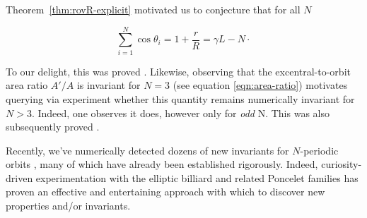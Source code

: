Theorem~\ref{thm:rovR-explicit} motivated us to conjecture that for all $N$

\begin{equation*}
\sum_{i=1}^{N}{\cos\theta_i}=1+\frac{r}{R}=\gamma L - N\cdot
\end{equation*}

\noindent To our delight, this was proved \cite{akopyan2020-invariants,bialy2020-invariants}. Likewise, observing that the excentral-to-orbit area ratio $A'/A$ is invariant for $N=3$ (see equation \eqref{eqn:area-ratio}) motivates querying via experiment whether this quantity remains numerically invariant for $N>3$. Indeed, one observes it does, however only for {\em odd} N. This was also subsequently proved \cite{akopyan2020-invariants}.

Recently, we've numerically detected dozens of new invariants for $N$-periodic orbits \cite{reznik2020-forty-invariants}, many of which have already been   established rigorously. Indeed, curiosity-driven experimentation with the elliptic billiard and related Poncelet families has proven an effective and entertaining approach with which to discover new properties and/or invariants.

